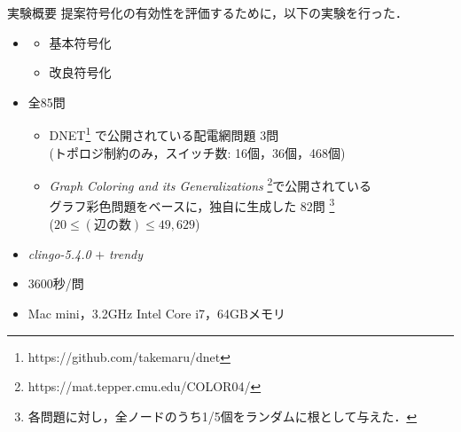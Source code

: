 \documentclass[dvipdfmx,11pt]{beamer}
\begin{document}
\begin{frame}{実験概要}
\renewcommand{\thefootnote}{\fnsymbol{footnote}}
\setcounter{footnote}{1}
提案符号化の有効性を評価するために，以下の実験を行った．

\begin{itemize}
 \item {}
	   \begin{itemize}
		\item 基本符号化
		\item 改良符号化
	   \end{itemize}
 \item {} 全85問
	   \begin{itemize}
		\item DNET\footnote{https://github.com/takemaru/dnet}%
			  で公開されている配電網問題 3問 \\ (トポロジ制約のみ，スイッチ数: 16個，36個，468個)
		\item \textit{Graph Coloring and its Generalizations}
			  \footnote{https://mat.tepper.cmu.edu/COLOR04/}で公開されている \\
			  グラフ彩色問題をベースに，独自に生成した 82問 
			  \footnote{各問題に対し，全ノードのうち1/5個をランダムに根として与えた．}\\
			  ($20 \leq (\textbf{辺の数}) \leq 49,629$)
	   \end{itemize}
 \item {} \textit{clingo-5.4.0} $+$ \textit{trendy}
 \item {} 3600秒/問
 \item {} Mac mini，3.2GHz Intel Core i7，64GBメモリ
\end{itemize}

\end{frame}
\end{document}
